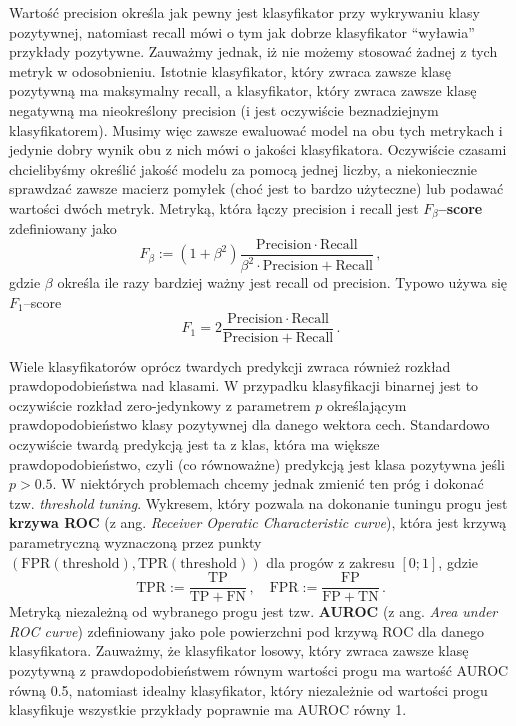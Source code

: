 \documentclass{myclass}
\numberwithin{equation}{subsection}
\begin{document}
Wartość precision określa jak pewny jest klasyfikator przy wykrywaniu klasy pozytywnej, natomiast
recall mówi o tym jak dobrze klasyfikator \enquote{wyławia} przykłady pozytywne. Zauważmy jednak, iż
nie możemy stosować żadnej z tych metryk w odosobnieniu. Istotnie klasyfikator, który zwraca zawsze
klasę pozytywną ma maksymalny recall, a klasyfikator, który zwraca zawsze klasę negatywną ma
nieokreślony precision (i jest oczywiście beznadziejnym klasyfikatorem). Musimy więc zawsze
ewaluować model na obu tych metrykach i jedynie dobry wynik obu z nich mówi o jakości klasyfikatora.
Oczywiście czasami chcielibyśmy określić jakość modelu za pomocą jednej liczby, a niekoniecznie
sprawdzać zawsze macierz pomyłek (choć jest to bardzo użyteczne) lub podawać wartości dwóch metryk.
Metryką, która łączy precision i recall jest \textbf{\(F_\beta\)--score} zdefiniowany jako
\begin{equation}
    F_\beta := (1 + \beta^2) \frac{\mathrm{Precision} \cdot \mathrm{Recall}}{\beta^2 \cdot \mathrm{Precision} + \mathrm{Recall}}\,, 
\end{equation}
gdzie \(\beta\) określa ile razy bardziej ważny jest recall od precision. Typowo używa się
\(F_1\)--score
\begin{equation}
    F_1 = 2\frac{\mathrm{Precision} \cdot \mathrm{Recall}}{\mathrm{Precision} + \mathrm{Recall}}\,. 
\end{equation}

Wiele klasyfikatorów oprócz twardych predykcji zwraca również rozkład prawdopodobieństwa nad
klasami. W przypadku klasyfikacji binarnej jest to oczywiście rozkład zero-jedynkowy z parametrem
\(p\) określającym prawdopodobieństwo klasy pozytywnej dla danego wektora cech. Standardowo
oczywiście twardą predykcją jest ta z klas, która ma większe prawdopodobieństwo, czyli (co
równoważne) predykcją jest klasa pozytywna jeśli \(p > 0.5\). W niektórych problemach chcemy jednak
zmienić ten próg i dokonać tzw. \textit{threshold tuning}. Wykresem, który pozwala na dokonanie
tuningu progu jest \textbf{krzywa ROC} (z ang. \textit{Receiver Operatic Characteristic curve}),
która jest krzywą parametryczną wyznaczoną przez punkty \((\mathrm{FPR}(\mathrm{threshold}),
\mathrm{TPR}(\mathrm{threshold}))\) dla progów z zakresu \([0;1]\), gdzie
\begin{equation}
    \mathrm{TPR} := \frac{\mathrm{TP}}{\mathrm{TP + FN}}\,,\quad \mathrm{FPR} := \frac{\mathrm{FP}}{\mathrm{FP + TN}}\,.
\end{equation}
Metryką niezależną od wybranego progu jest tzw. \textbf{AUROC} (z ang. \textit{Area under ROC
curve}) zdefiniowany jako pole powierzchni pod krzywą ROC dla danego klasyfikatora. Zauważmy, że
klasyfikator losowy, który zwraca zawsze klasę pozytywną z prawdopodobieństwem równym wartości progu
ma wartość AUROC równą 0.5, natomiast idealny klasyfikator, który niezależnie od wartości progu
klasyfikuje wszystkie przykłady poprawnie ma AUROC równy 1.
\end{document}
